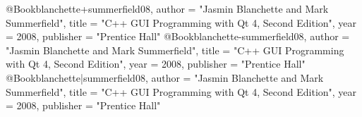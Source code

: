 @Book{blanchette+summerfield08,
    author = "Jasmin Blanchette and Mark Summerfield",
    title = "C++ GUI Programming with Qt 4,
    Second Edition",
    year = 2008,
    publisher = "Prentice Hall"
}
@Book{blanchette-summerfield08,
    author = "Jasmin Blanchette and Mark Summerfield",
    title = "C++ GUI Programming with Qt 4,
    Second Edition",
    year = 2008,
    publisher = "Prentice Hall"
}
@Book{blanchette|summerfield08,
    author = "Jasmin Blanchette and Mark Summerfield",
    title = "C++ GUI Programming with Qt 4,
    Second Edition",
    year = 2008,
    publisher = "Prentice Hall"
}